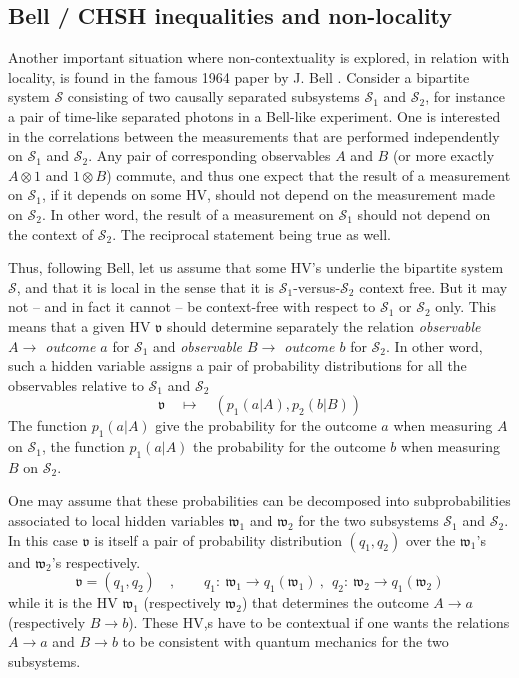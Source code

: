 \subsection{Bell / CHSH inequalities and non-locality}
Another important situation where non-contextuality is explored, in relation with locality, is found in the famous 1964 paper by J. Bell 
\cite{Bell:1964kc}. 
Consider a bipartite system $\mathcal{S}$ consisting of two causally separated subsystems $\mathcal{S}_1$ and $\mathcal{S}_2$, for instance a pair of time-like separated photons in a  Bell-like experiment. One is interested in the correlations between the measurements that are performed independently on $\mathcal{S}_1$ and $\mathcal{S}_2$. 
Any pair of corresponding observables $A$ and $B$ (or more exactly $A\otimes 1$ and $1\otimes B$) commute, and thus one expect that the result of a measurement on $\mathcal{S}_1$, if it depends on some HV, should not depend on the measurement made on $\mathcal{S}_2$. In other word, the result of a measurement on $\mathcal{S}_1$ should not depend on the context of $\mathcal{S}_2$. The reciprocal statement being true as well. 

Thus, following Bell, let us assume that some HV's underlie the bipartite system $\mathcal{S}$, and that it is local in the sense that it is $\mathcal{S}_1$-versus-$\mathcal{S}_2$ context free. But it may not -- and in fact  it cannot -- be context-free with respect to $\mathcal{S}_1$ or $\mathcal{S}_2$ only. This means that a given HV $\mathfrak{v}$ should determine separately the relation \emph{observable $A\to$ outcome $a$}  for  $\mathcal{S}_1$  and  \emph{observable $B\to$ outcome $b$} for $\mathcal{S}_2$. In other word, such a hidden variable assigns a pair of probability distributions for all the observables relative to $\mathcal{S}_1$ and $\mathcal{S}_2$
\begin{equation}
\label{locHV}
\mathfrak{v}\quad
\mapsto\quad (p_1(a|A),p_2(b|B))
\end{equation}
The function $p_1(a|A)$ give the probability for the outcome $a$ when measuring $A$ on $\mathcal{S}_1$, the function $p_1(a|A)$  the probability for the outcome $b$ when measuring $B$ on $\mathcal{S}_2$.

One may assume that these probabilities can be decomposed into subprobabilities associated to local hidden variables $\mathfrak{w}_1$ and $\mathfrak{w}_2$  for the two subsystems $\mathcal{S}_1$ and $\mathcal{S}_2$. In this case $\mathfrak{v}$ is itself a pair of probability distribution $(q_1,q_2)$ over the $\mathfrak{w}_1$'s and $\mathfrak{w}_2$'s respectively.
\begin{equation}
\label{ }
\mathfrak{v}=(q_1,q_2)
\quad,\qquad q_1:\ \mathfrak{w}_1\to q_1(\mathfrak{w}_1)\ ,\ \ q_2:\ \mathfrak{w}_2\to q_1(\mathfrak{w}_2)
\end{equation} 
while it is the HV $\mathfrak{w}_1$ (respectively $\mathfrak{w}_2$) that determines the outcome $A\to a$ (respectively $B\to b$). 
These HV,s have to be contextual if one wants the relations $A\to a$ and $B\to b$  to be consistent with quantum mechanics for the two subsystems.

